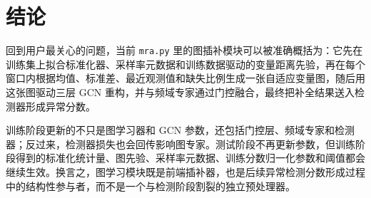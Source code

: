 \documentclass[UTF8]{ctexart}
\begin{document}
\section{结论}

回到用户最关心的问题，当前 \texttt{mra.py} 里的图插补模块可以被准确概括为：它先在训练集上拟合标准化器、采样率元数据和训练数据驱动的变量距离先验，再在每个窗口内根据均值、标准差、最近观测值和缺失比例生成一张自适应变量图，随后用这张图驱动三层 GCN 重构，并与频域专家通过门控融合，最终把补全结果送入检测器形成异常分数。

训练阶段更新的不只是图学习器和 GCN 参数，还包括门控层、频域专家和检测器；反过来，检测器损失也会回传影响图专家。测试阶段不再更新参数，但训练阶段得到的标准化统计量、图先验、采样率元数据、训练分数归一化参数和阈值都会继续生效。换言之，图学习模块既是前端插补器，也是后续异常检测分数形成过程中的结构性参与者，而不是一个与检测阶段割裂的独立预处理器。
\end{document}
